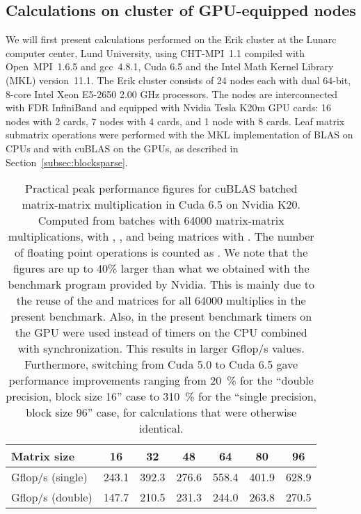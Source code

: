 \documentclass{elsarticle}
\begin{document}
\subsection{Calculations on cluster of GPU-equipped nodes}\label{sec:gpu-calculations}
We will first present calculations performed on the Erik cluster at
the Lunarc computer center, Lund University, using CHT-MPI~1.1 compiled with Open~MPI~1.6.5 
and gcc~4.8.1, Cuda 6.5 and the Intel Math Kernel Library (MKL) version~11.1.
The Erik cluster consists of 24 nodes each with dual 64-bit, 8-core
Intel Xeon E5-2650 2.00 GHz processors.  The nodes are interconnected
with FDR InfiniBand and equipped with Nvidia Tesla K20m GPU cards: 16
nodes with 2 cards, 7 nodes with 4 cards, and 1 node with 8 cards.
Leaf matrix submatrix operations were performed with the MKL
implementation of BLAS on CPUs and with cuBLAS on the GPUs, as
described in Section~\ref{subsec:blocksparse}.


\begin{table}
  \begin{center}
    \begin{tabular}{l|cccccc}
      Matrix size      &    16 &    32 &    48 &    64 &    80 &    96 \\
      \hline
      Gflop/s (single) & 243.1 & 392.3 & 276.6 & 558.4 & 401.9 & 628.9 \\
      Gflop/s (double) & 147.7 & 210.5 & 231.3 & 244.0 & 263.8 & 270.5
    \end{tabular}
  \end{center}
  \caption{Practical peak performance figures for cuBLAS batched
    matrix-matrix multiplication in Cuda 6.5 on Nvidia K20. Computed
    from batches with 64000 matrix-matrix multiplications,  with , ,
    and  being  matrices with .  The number of floating point operations is
    counted as . We note that the figures are up to
    40\% larger than what we obtained with the benchmark program
    provided by Nvidia. This is mainly due to the reuse of the  and
     matrices for all 64000 multiplies in the present
    benchmark. Also, in the present benchmark timers on the GPU were
    used instead of timers on the CPU combined with
    synchronization. This results in larger Gflop/s values.
    Furthermore, switching from Cuda 5.0 to Cuda 6.5 gave performance
    improvements ranging from 20~\% for the ``double precision, block
    size 16'' case to 310~\% for the ``single precision, block size
    96'' case, for calculations that were otherwise identical.
    \label{tab:performance_batched_gemm}}
\end{table}
\end{document}

